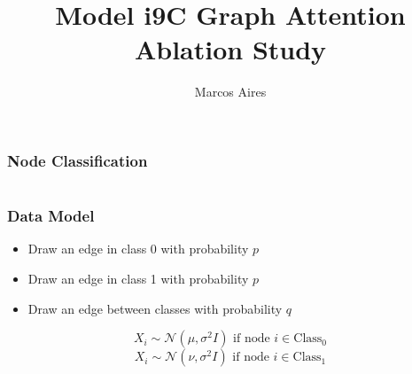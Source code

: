 \documentclass{beamer}
\title{Model i9C Graph Attention Ablation Study}
\author{Marcos Aires}
\institute{University of Fortaleza}
\begin{document}
    \begin{frame}
    \titlepage
    \end{frame}

    \begin{frame}
    \frametitle{Node Classification}
    \begin{columns}
    \end{columns}
    \end{frame}

    \begin{frame}
    \frametitle{Data Model}
    \begin{itemize}
    \item Draw an edge in class 0 with probability $p$
    \item Draw an edge in class 1 with probability $p$
    \item Draw an edge between classes with probability $q$
    \end{itemize}

    \[ X_i \sim \mathcal{N}(\mu, \sigma^2I) \text{ if node } i \in \text{Class}_0 \]
    \[ X_i \sim \mathcal{N}(\nu, \sigma^2I) \text{ if node } i \in \text{Class}_1 \]
    \end{frame}

    
\end{document}
